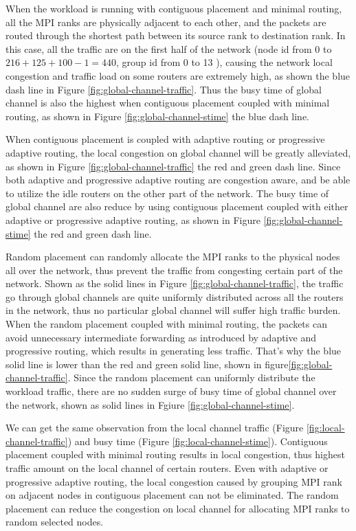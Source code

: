 \documentclass[conference,compsoc]{IEEEtran}
\begin{document}
When the workload is running with contiguous placement and minimal routing, all the MPI ranks are physically adjacent to each other, and the packets are routed through the shortest path between its source rank to destination rank. In this case, all the traffic are on the first half of the network (node id from 0 to $216+125+100-1=440$, group id from 0 to 13 ), causing the network local congestion and traffic load on some routers are extremely high, as shown the blue dash line in Figure \ref{fig:global-channel-traffic}. Thus the busy time of global channel is also the highest when contiguous placement coupled with minimal routing, as shown in Figure \ref{fig:global-channel-stime} the blue dash line. 

When contiguous placement is coupled with adaptive routing or progressive adaptive routing, the local congestion on global channel will be greatly alleviated, as shown in Figure \ref{fig:global-channel-traffic} the red and green dash line. Since both adaptive and progressive adaptive routing are congestion aware, and be able to utilize the idle routers on the other part of the network. The busy time of global channel are also reduce by using contiguous placement coupled with either adaptive or progressive adaptive routing, as shown in Figure \ref{fig:global-channel-stime} the red and green dash line. 

Random placement can randomly allocate the MPI ranks to the physical nodes all over the network, thus prevent the traffic from congesting certain part of the network. Shown as the solid lines in Figure \ref{fig:global-channel-traffic}, the traffic go through global channels are quite uniformly distributed across all the routers in the network, thus no particular global channel will suffer high traffic burden. When the random placement coupled with minimal routing, the packets can avoid unnecessary intermediate forwarding as introduced by adaptive and progressive routing, which results in generating less traffic. That's why the blue solid line is lower than the red and green solid line, shown in figure\ref{fig:global-channel-traffic}. Since the random placement can uniformly distribute the workload traffic, there are no sudden surge of busy time of global channel over the network, shown as solid lines in Fgiure \ref{fig:global-channel-stime}.


We can get the same observation from the local channel traffic (Figure \ref{fig:local-channel-traffic}) and busy time (Figure \ref{fig:local-channel-stime}). Contiguous placement coupled with minimal routing results in local congestion, thus highest traffic amount on the local channel of certain routers. Even with adaptive or progressive adaptive routing, the local congestion caused by grouping MPI rank on adjacent nodes in contiguous placement can not be eliminated. The random placement can reduce the congestion on local channel for allocating MPI ranks to random selected nodes. 
\end{document}

